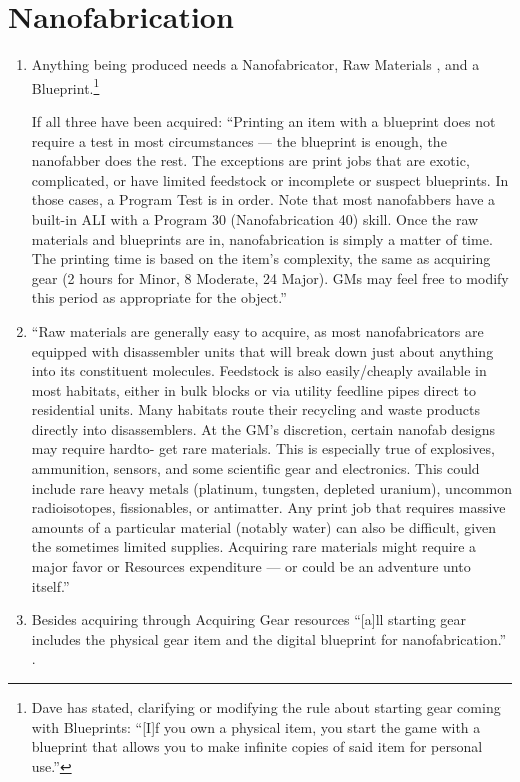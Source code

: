 \section{Nanofabrication}

\begin{enumerate}
    \item Anything being produced needs a \gls{Nanofabricator}, Raw Materials \citep[p. 314]{ep2e_1.1_2019}, and a \gls{Blueprint}.\footnote{Dave has stated, clarifying or modifying the rule about starting gear coming with \glspl{Blueprint}: “[I]f you own a physical item, you start the game with a blueprint that allows you to make infinite copies of said item for personal use.”}

    If all three have been acquired: “Printing an item with a blueprint does not require a test in most circumstances — the blueprint is enough, the nanofabber does the rest. The exceptions are print jobs that are exotic, complicated, or have limited feedstock or incomplete or suspect blueprints. In those cases, a Program Test is in order. Note that most nanofabbers have a built-in ALI with a Program 30 (Nanofabrication 40) skill. Once the raw materials and blueprints are in, nanofabrication is simply a matter of time. The printing time is based on the item’s complexity, the same as acquiring gear (2 hours for Minor, 8 Moderate, 24 Major). GMs may feel free to modify this period as appropriate for the object.” \citep[pg. 314]{ep2e_1.1_2019}

    \item “Raw materials are generally easy to acquire, as most nanofabricators are equipped with disassembler units that will break down just about anything into its constituent molecules. Feedstock is also easily/cheaply available in most habitats, either in bulk blocks or via utility feedline pipes direct to residential units. Many habitats route their recycling and waste products directly into disassemblers. At the GM’s discretion, certain nanofab designs may require hardto- get rare materials. This is especially true of explosives, ammunition, sensors, and some scientific gear and electronics. This could include rare heavy metals (platinum, tungsten, depleted uranium), uncommon radioisotopes, fissionables, or antimatter. Any print job that requires massive amounts of a particular material (notably water) can also be difficult, given the sometimes limited supplies. Acquiring rare materials might require a major favor or Resources expenditure — or could be an adventure unto itself.” \citep[pg. 314]{ep2e_1.1_2019}
    \item Besides acquiring  through Acquiring Gear resources “[a]ll starting gear includes the physical gear item and the digital blueprint for nanofabrication.” \citep[pg. 68]{ep2e_1.1_2019}.


\end{enumerate}
